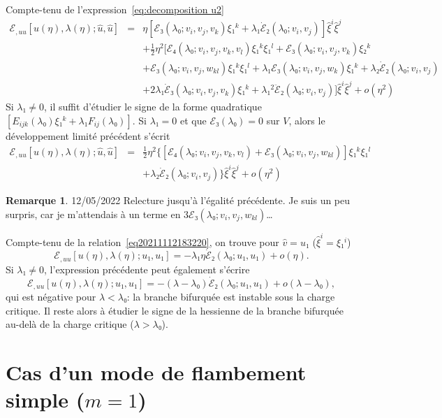 \documentclass[12pt, final]{amsart}
\theoremstyle{definition}
\newtheorem{remark}{Remarque}
\begin{document}
Compte-tenu de l'expression~\eqref{eq:decomposition u2}
\begin{eqnarray}
  ℰ_{, u  u} [u (η), λ (η) ; \hat{u}, \hat{u}] &
  = & η [ℰ₃ (λ₀ ; v_i, v_j, v_k) ξ₁^k + λ₁
  \dot{ℰ}₂ (λ₀ ; v_i, v_j)]  \hat{ξ}^i  \hat{ξ}^j
  \nonumber\\
  &  & + \tfrac{1}{2} η^2  [ℰ₄ (λ₀ ; v_i, v_j, v_k, v_l)
  ξ₁^k ξ₁^l +ℰ₃ (λ₀ ; v_i, v_j, v_k) ξ₂^k
   \nonumber\\
  &  & +ℰ₃ (λ₀ ; v_i, v_j, w_{k  l}) ξ₁^k
  ξ₁^l + λ₁ ℰ₃ (λ₀ ; v_i, v_j, w_k) ξ₁^k +
  λ₂  \dot{ℰ}₂ (λ₀ ; v_i, v_j) \nonumber\\
  &  &  + 2 λ₁  \dot{ℰ}₃ (λ₀ ; v_i, v_j,
  v_k) ξ₁^k + λ₁^2  \ddot{ℰ}₂ (λ₀ ; v_i, v_j)]
  \hat{ξ}^i  \hat{ξ}^j + o (η^2) \nonumber
\end{eqnarray}
Si $λ₁ \neq 0$, il suffit d'étudier le signe de la forme
quadratique $[E_{i  j  k} (λ₀) ξ₁^k + λ₁ F_{i
 j} (λ₀)] .$ Si $λ₁ = 0$ et que $ℰ₃
(λ₀) = 0$ sur $V$, alors le développement limité
précédent s'écrit
\begin{eqnarray}
  ℰ_{, u  u} [u (η), λ (η) ; \hat{u}, \hat{u}] &
  = & \tfrac{1}{2} η^2  \{ [ℰ₄ (λ₀ ; v_i, v_j, v_k, v_l)
   +ℰ₃ (λ₀ ; v_i, v_j, w_{k  l})] ξ₁^k
  ξ₁^l \nonumber\\
  &  & +  λ₂  \dot{ℰ}₂ (λ₀ ; v_i, v_j) \}
  \hat{ξ}^i  \hat{ξ}^j + o (η^2) \nonumber
\end{eqnarray}

\begin{remark}
  12/05/2022 Relecture jusqu'à l'égalité précédente. Je
  suis un peu surpris, car je m'attendais à un terme en $3ℰ₃
  (λ₀ ; v_i, v_j, w_{k  l})$\dots
\end{remark}

Compte-tenu de la relation~\eqref{eq20211112183220}, on trouve pour $\hat{v} =
u₁$ ($\hat{ξ}^i = ξ₁^i$)
\begin{equation}
  ℰ_{, u  u} [u (η), λ (η) ; u₁, u₁] = -
  λ₁ η \dot{ℰ}₂ (λ₀ ; u₁, u₁) + o (η) .
\end{equation}
Si $λ₁ \neq 0$, l'expression précédente peut également
s'écrire
\begin{equation}
  ℰ_{, u  u} [u (η), λ (η) ; u₁, u₁] = -
  (λ - λ₀)  \dot{ℰ}₂ (λ₀ ; u₁, u₁) + o
  (λ - λ₀),
\end{equation}
qui est négative pour $λ < λ₀$: la branche bifurquée est
instable sous la charge critique. Il reste alors à étudier le signe de
la hessienne de la branche bifurquée au-delà de la charge critique
($λ > λ₀$).

\section{Cas d'un mode de flambement simple ($m = 1$)}
\end{document}
